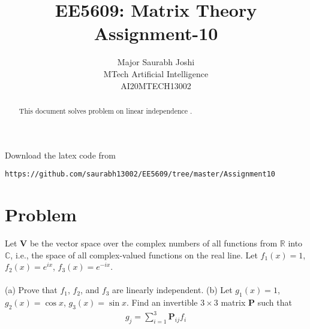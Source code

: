 \documentclass[journal,12pt,twocolumn]{IEEEtran}
\begin{document}
\makeatletter
{}
\makeatother
\let\StandardTheFigure\thefigure
\let\vec\mathbf
\renewcommand{\thefigure}{\theproblem}
\def\putbox#1#2#3{\makebox[0in][l]{\makebox[#1][l]{}\raisebox{\baselineskip}[0in][0in]{\raisebox{#2}[0in][0in]{#3}}}}
     \def\rightbox#1{\makebox[0in][r]{#1}}
     \def\centbox#1{\makebox[0in]{#1}}
     \def\topbox#1{\raisebox{-\baselineskip}[0in][0in]{#1}}
     \def\midbox#1{\raisebox{-0.5\baselineskip}[0in][0in]{#1}}
\vspace{3cm}
\title{EE5609: Matrix Theory\\
          Assignment-10\\}
\author{Major Saurabh Joshi\\MTech Artificial Intelligence\\AI20MTECH13002 }
\maketitle
\newpage
\bigskip
\renewcommand{\thefigure}{\theenumi}
\renewcommand{\thetable}{\theenumi}
\begin{abstract}
This document solves problem on linear independence .  
\end{abstract}
Download the latex code from 
%
%
%
\begin{lstlisting}
https://github.com/saurabh13002/EE5609/tree/master/Assignment10
\end{lstlisting}
%
\section{Problem}
Let $\vec{V}$ be the vector space over the complex numbers of all functions from $\mathbb{R}$ into $\mathbb{C}$, i.e., the space of all complex-valued functions on the real line. Let $f_1(x)=1$, $f_2(x)=e^{ix}$, $f_3(x)=e^{-ix}$.\\\\
(a) Prove that $f_1$, $f_2$, and $f_3$ are linearly independent.
(b) Let $g_1(x)=1$, $g_2(x)=\cos{x}$, $g_3(x)=\sin{x}$. Find an invertible $3\times3$ matrix $\vec{P}$ such that
\begin{align}
    g_j=\sum\limits_{i=1}^3 \vec{P}_{ij}f_i\label{eq}
\end{align}
\end{document}
